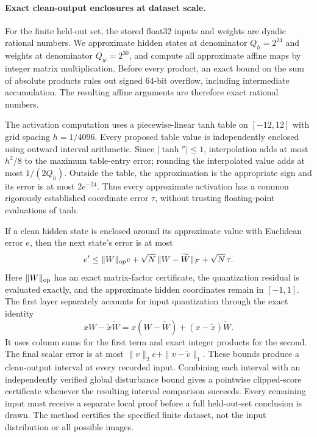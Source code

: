 \paragraph{Exact clean-output enclosures at dataset scale.}
For the finite held-out set, the stored float32 inputs and weights are
dyadic rational numbers. We approximate hidden states at denominator
$Q_h=2^{24}$ and weights at denominator $Q_w=2^{30}$, and compute all
approximate affine maps by integer matrix multiplication. Before every
product, an exact bound on the sum of absolute products rules out
signed 64-bit overflow, including intermediate accumulation.
The resulting affine arguments are therefore exact rational numbers.

The activation computation uses a piecewise-linear tanh table on
$[-12,12]$ with grid spacing $h=1/4096$. Every proposed table value is
independently enclosed using outward interval arithmetic. Since
$|\tanh''|\le1$, interpolation adds at most $h^2/8$ to the maximum
table-entry error; rounding the interpolated value adds at most
$1/(2Q_h)$. Outside the table, the approximation is the appropriate
sign and its error is at most $2e^{-24}$. Thus every approximate
activation has a common rigorously established coordinate error
$\tau$, without trusting floating-point evaluations of tanh.

If a clean hidden state is enclosed around its approximate value with
Euclidean error $e$, then the next state's error is at most
\[
 e'\le\|W\|_{\rm op}e
       +\sqrt N\,\|W-\widetilde W\|_F+\sqrt N\,\tau.
\]
Here $\|W\|_{\rm op}$ has an exact matrix-factor certificate,
the quantization residual is evaluated exactly, and the approximate
hidden coordinates remain in $[-1,1]$. The first layer separately
accounts for input quantization through the exact identity
\[
 xW-\widetilde x\widetilde W
  =x(W-\widetilde W)+(x-\widetilde x)\widetilde W.
\]
It uses column sums for the first term and exact integer products for
the second. The final scalar error is at most
$\|v\|_2e+\|v-\widetilde v\|_1$.
These bounds produce a clean-output interval at every recorded input.
Combining each interval with an independently verified global
disturbance bound gives a pointwise clipped-score certificate whenever
the resulting interval comparison succeeds. Every remaining input must
receive a separate local proof before a full held-out-set conclusion
is drawn. The method certifies the specified finite dataset, not the
input distribution or all possible images.
